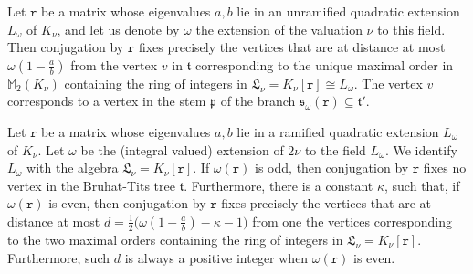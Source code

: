 \documentclass[10pt,a4paper]{amsart}
\begin{document}
\begin{Lem}\label{l61c}
     Let $\mathtt{r}$ be a matrix whose eigenvalues $a,b$
     lie in an unramified quadratic extension 
     $L_\omega$ of $K_\nu$,
     and let us denote by $\omega$ the extension 
     of the valuation
     $\nu$ to this field. Then conjugation by $\mathtt{r}$
    fixes precisely the vertices that are at distance at most 
    $\omega\left(1-\frac ab\right)$ from the vertex $v$ 
    in $\mathfrak{t}$ corresponding
    to the unique maximal order in
    $\mathbb{M}_2(K_\nu)$ containing the ring 
    of integers in 
    $\mathfrak{L}_\nu=K_\nu[\mathtt{r}]\cong L_\omega$. 
    The vertex $v$ corresponds to
    a vertex in the stem $\mathfrak{p}$ of the branch
    $\mathfrak{s}_\omega(\mathtt{r})\subseteq \mathfrak{t}'$.
\end{Lem}

\begin{Lem}\label{l61d}
     Let $\mathtt{r}$ be a matrix whose eigenvalues $a,b$
     lie in a ramified quadratic extension 
     $L_\omega$ of $K_\nu$. 
       Let $\omega$ be the (integral valued) 
       extension of $2\nu$
     to the field $L_\omega$. We identify
     $L_\omega$ with the algebra
     $\mathfrak{L}_\nu=K_\nu[\mathtt{r}]$. 
     If $\omega(\mathtt{r})$ is odd,
    then conjugation by $\mathtt{r}$ fixes no vertex
    in the Bruhat-Tits tree $\mathfrak{t}$.
    Furthermore, there is a constant $\kappa$, such that,
    if $\omega(\mathtt{r})$ is even,
    then conjugation by $\mathtt{r}$ 
    fixes precisely the vertices that are at distance at most 
    $d=\frac12\big(\omega
    \left(1-\frac ab\right)-\kappa-1\big)$ 
    from one the vertices 
    corresponding to the two maximal orders 
    containing the ring 
    of integers in 
    $\mathfrak{L}_\nu=K_\nu[\mathtt{r}]$. Furthermore,
    such $d$ is always a positive integer when 
    $\omega(\mathtt{r})$ is even.
\end{Lem}
\end{document}
